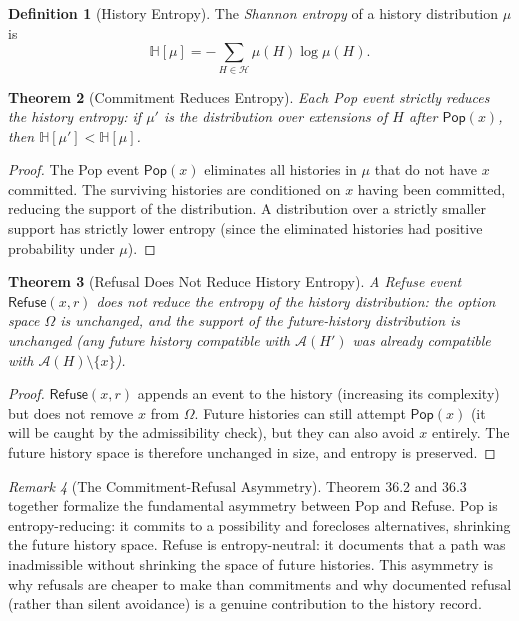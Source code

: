 \documentclass[12pt, a4paper, openany]{book}
\theoremstyle{plain}
\newtheorem{theorem}{Theorem}[chapter]
\theoremstyle{definition}
\newtheorem{definition}[theorem]{Definition}
\theoremstyle{remark}
\newtheorem{remark}[theorem]{Remark}
\newcommand{\Pop}{\mathsf{Pop}}
\newcommand{\Refuse}{\mathsf{Refuse}}
\newcommand{\calH}{\mathcal{H}}
\newcommand{\calA}{\mathcal{A}}
\begin{document}
\begin{definition}[History Entropy]
The \emph{Shannon entropy} of a history distribution $\mu$ is
\[
\mathbb{H}[\mu] = -\sum_{H \in \calH} \mu(H) \log \mu(H).
\]
\end{definition}

\begin{theorem}[Commitment Reduces Entropy]
Each Pop event strictly reduces the history entropy: if $\mu'$ is the
distribution over extensions of $H$ after $\Pop(x)$, then
$\mathbb{H}[\mu'] < \mathbb{H}[\mu]$.
\end{theorem}

\begin{proof}
The Pop event $\Pop(x)$ eliminates all histories in $\mu$ that do not have
$x$ committed. The surviving histories are conditioned on $x$ having been
committed, reducing the support of the distribution. A distribution over a
strictly smaller support has strictly lower entropy (since the eliminated
histories had positive probability under $\mu$).
\end{proof}

\begin{theorem}[Refusal Does Not Reduce History Entropy]
A Refuse event $\Refuse(x, r)$ does not reduce the entropy of the history
distribution: the option space $\Omega$ is unchanged, and the support of
the future-history distribution is unchanged (any future history compatible
with $\calA(H')$ was already compatible with $\calA(H) \setminus \{x\}$).
\end{theorem}

\begin{proof}
$\Refuse(x, r)$ appends an event to the history (increasing its complexity)
but does not remove $x$ from $\Omega$. Future histories can still attempt
$\Pop(x)$ (it will be caught by the admissibility check), but they can also
avoid $x$ entirely. The future history space is therefore unchanged in size,
and entropy is preserved.
\end{proof}

\begin{remark}[The Commitment-Refusal Asymmetry]
Theorem 36.2 and 36.3 together formalize the fundamental asymmetry between
Pop and Refuse. Pop is entropy-reducing: it commits to a possibility and
forecloses alternatives, shrinking the future history space. Refuse is
entropy-neutral: it documents that a path was inadmissible without shrinking
the space of future histories. This asymmetry is why refusals are cheaper
to make than commitments and why documented refusal (rather than silent
avoidance) is a genuine contribution to the history record.
\end{remark}
\end{document}
